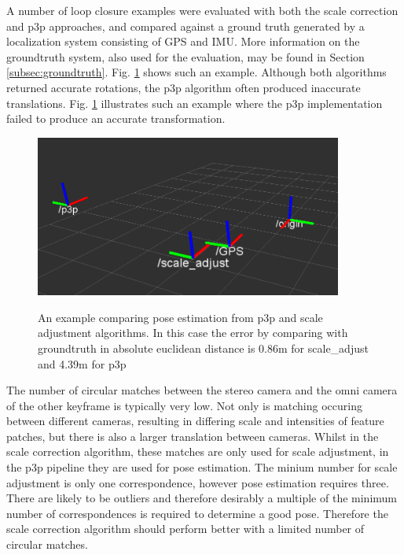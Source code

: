 A number of loop closure examples were evaluated with both the scale correction and p3p approaches, and compared against a ground truth generated by a localization system consisting of GPS and IMU.  More information on the groundtruth system, also used for the evaluation, may be found in Section \ref{subsec:groundtruth}.  Fig. \ref{fig:scale_vs_p3p} shows such an example.  Although both algorithms returned accurate rotations, the p3p algorithm often produced inaccurate translations.  Fig. \ref{fig:scale_vs_p3p} illustrates such an example where the p3p implementation failed to produce an accurate transformation. 

\begin{figure}[h]
  \centering
    \includegraphics[width=0.9\textwidth]{chapters/images/scale_vs_p3p_1}\\
  \caption{An example comparing pose estimation from p3p and scale adjustment algorithms.  In this case the error by comparing with groundtruth in absolute euclidean distance is 0.86m for scale\_adjust and 4.39m for p3p}
  \label{fig:scale_vs_p3p}
\end{figure}

The number of circular matches between the stereo camera and the omni camera of the other keyframe is typically very low.  Not only is matching occuring between different cameras, resulting in differing scale and intensities of feature patches, but there is also a larger translation between cameras. Whilst in the scale correction algorithm, these matches are only used for scale adjustment, in the p3p pipeline they are used for pose estimation.  The minium number for scale adjustment is only one correspondence, however pose estimation requires three.  There are likely to be outliers and therefore desirably a multiple of the minimum number of correspondences is required to determine a good pose.  Therefore the scale correction algorithm should perform better with a limited number of circular matches. 

